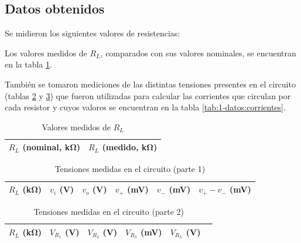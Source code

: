 \subsection{Datos obtenidos}

Se midieron los siguientes valores de resistencias:

\begin{itemize}
        
\end{itemize}

Los valores medidos de $R_L$, comparados con sus valores nominales, se encuentran en la tabla \ref{tab:1-datos:resistencias-l}.

También se tomaron mediciones de las distintas tensiones presentes en el circuito (tablas \ref{tab:1-datos:tensiones-1} y \ref{tab:1-datos:tensiones-2}) que fueron utilizadas para calcular las corrientes que circulan por cada resistor y cuyos valores se encuentran en la tabla \ref{tab:1-datos:corrientes}.

\begin{table}[H]
    \centering
    \begin{tabular}{@{}rr@{}}
        \toprule
        $R_L$ (nominal, \si{\kilo\ohm}) & $R_L$ (medido, \si{\kilo\ohm})  \\
        \midrule
        
    \end{tabular}
    \caption{Valores medidos de $R_L$}
    \label{tab:1-datos:resistencias-l}
\end{table}

\begin{table}[H]
    \centering
    \begin{tabular}{@{}rrrrrr@{}}
        \toprule
        $R_L$ (\si{\kilo\ohm}) & $v_i$ (\si{\volt}) & $v_o$ (\si{\volt}) & 
            $v_+$ (\si{\milli\volt}) & $v_-$ (\si{\milli\volt}) &
            $v_+ - v_-$ (\si{\milli\volt}) \\
        \midrule
        
    \end{tabular}
    \caption{Tensiones medidas en el circuito (parte 1)}
    \label{tab:1-datos:tensiones-1}
\end{table}

\begin{table}[H]
    \centering
    \begin{tabular}{@{}rrrrrr@{}}
        \toprule
        $R_L$ (\si{\kilo\ohm}) & $V_{R_1}$ (\si{\volt}) & $V_{R_2}$ (\si{\volt})& $V_{R_3}$ (\si{\milli\volt}) & $V_{R_L}$ (\si{\volt}) \\
        \midrule
        
    \end{tabular}
    \caption{Tensiones medidas en el circuito (parte 2)}
    \label{tab:1-datos:tensiones-2}
\end{table}

